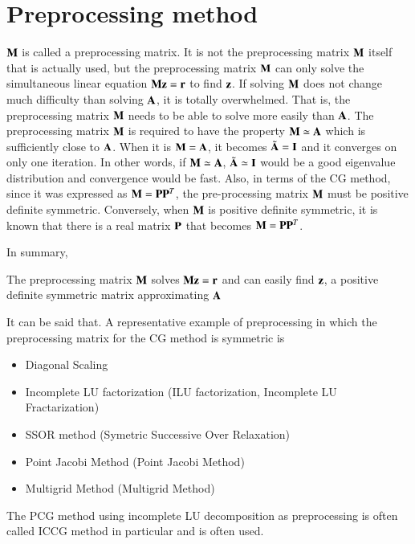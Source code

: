 \section{Preprocessing method}

$\mathbf{M}$ is called a preprocessing matrix. 
%
It is not the preprocessing matrix $\mathbf{M}$ itself that is actually used, but the preprocessing matrix $\mathbf{M}$ can only solve the simultaneous linear equation $\mathbf{M}\mathbf{z}=\mathbf{r}$ to find $\mathbf{z}$. 
%
If solving $\mathbf{M}$ does not change much difficulty than solving $\mathbf{A}$, it is totally overwhelmed. 
%
That is, the preprocessing matrix $\mathbf{M}$ needs to be able to solve more easily than $\mathbf{A}$. The preprocessing matrix $\mathbf{M}$ is required to have the property $\mathbf{M}\simeq\mathbf{A}$ which is sufficiently close to $\mathbf{A}$. 
%
When it is $\mathbf{M}=\mathbf{A}$, it becomes $\tilde{\mathbf{A}}=\mathbf{I}$ and it converges on only one iteration. In other words, if $\mathbf{M}\simeq\mathbf{A}$, $\tilde{\mathbf{A}}\simeq\mathbf{I}$ would be a good eigenvalue distribution and convergence would be fast. 
%
Also, in terms of the CG method, since it was expressed as $\mathbf{M}=\mathbf{P}\mathbf{P}^T$, the pre-processing matrix $\mathbf{M}$ must be positive definite symmetric. 
%
Conversely, when $\mathbf{M}$ is positive definite symmetric, it is known that there is a real matrix $\mathbf{P}$ that becomes $\mathbf{M}=\mathbf{P}\mathbf{P}^T$. 

In summary,

\begin{tcolorbox}[title=desirable property as pre-processing matrix]
The preprocessing matrix $\mathbf{M}$ solves $\mathbf{M}\mathbf{z}=\mathbf{r}$ and can easily find $\mathbf{z}$, a positive definite symmetric matrix approximating $\mathbf{A}$
\end{tcolorbox}

It can be said that. A representative example of preprocessing in which the preprocessing matrix for the CG method is symmetric is

\begin {itemize}
\item Diagonal Scaling
\item Incomplete LU factorization (ILU factorization, Incomplete LU Fractarization)
\item SSOR method (Symetric Successive Over Relaxation)
\item Point Jacobi Method (Point Jacobi Method)
\item Multigrid Method (Multigrid Method)
\end {itemize}


The PCG method using incomplete LU decomposition as preprocessing is often called ICCG method in particular and is often used.


